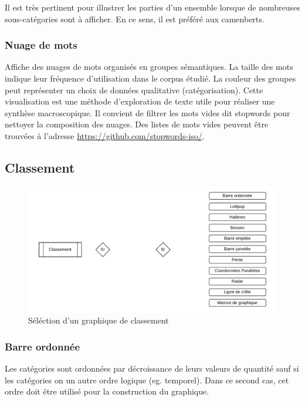 \documentclass[a4paper,12pt]{article}
\begin{document}
\begin{multicols}{2}
Il est très pertinent pour illustrer les parties d'un ensemble lorsque de nombreuses sous-catégories sont à afficher. \autocite{jonathanschwabishParttowhole2021} En ce sens, il est préféré aux camenberts.
\subsubsection*{Nuage de mots}
\label{sec:org4706654}
Affiche des nuages de mots organisés en groupes sémantiques. La taille des mots indique leur fréquence d'utilisation dans le corpus étudié. La couleur des groupes peut représenter un choix de données qualitative (catégorisation). \autocite{sosulskiGraphics2019} Cette visualisation est une méthode d'exploration de texte utile pour réaliser une synthèse macroscopique.
Il convient de filtrer les mots vides dit \og stopwords\fg{} pour nettoyer la composition des nuages. \autocite{jonathanschwabishQualitative2021} Des listes de mots vides peuvent être trouvées à l'adresse \url{https://github.com/stopwords-iso/}.
\subsection*{Classement}
\label{sec:orga55f0d1}

\begin{figure}
\centering
\includegraphics[width=.9\linewidth]{./img/select-classement.pdf}
\caption{\label{fig:select-classement}Séléction d'un graphique de classement}
\end{figure}
\subsubsection*{Barre ordonnée}
\label{sec:org30b834a}
Les catégories sont ordonnées par décroissance de leurs valeurs de quantité\autocite{jonathanschwabishComparingCategories2021} sauf si les catégories on un autre ordre logique (eg. temporel). Dans ce second cas, cet ordre doit être utilisé pour la construction du graphique. \autocite{wilkeVisualizingAmounts2019}


\end{multicols}
\end{document}

